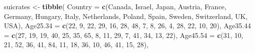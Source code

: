 \documentclass[
]{article}
\newenvironment{Shaded}{\begin{snugshade}}{\end{snugshade}}
\newcommand{\AttributeTok}[1]{\textcolor[rgb]{0.13,0.29,0.53}{#1}}
\newcommand{\DecValTok}[1]{\textcolor[rgb]{0.00,0.00,0.81}{#1}}
\newcommand{\FunctionTok}[1]{\textcolor[rgb]{0.13,0.29,0.53}{\textbf{#1}}}
\newcommand{\NormalTok}[1]{#1}
\newcommand{\OtherTok}[1]{\textcolor[rgb]{0.56,0.35,0.01}{#1}}
\newcommand{\StringTok}[1]{\textcolor[rgb]{0.31,0.60,0.02}{#1}}
\begin{document}
\begin{Shaded}
\begin{Highlighting}[]
\NormalTok{suicrates }\OtherTok{\textless{}{-}} \FunctionTok{tibble}\NormalTok{(}
  \AttributeTok{Country =} \FunctionTok{c}\NormalTok{(}\StringTok{\textquotesingle{}Canada\textquotesingle{}}\NormalTok{, }\StringTok{\textquotesingle{}Israel\textquotesingle{}}\NormalTok{, }\StringTok{\textquotesingle{}Japan\textquotesingle{}}\NormalTok{, }\StringTok{\textquotesingle{}Austria\textquotesingle{}}\NormalTok{, }\StringTok{\textquotesingle{}France\textquotesingle{}}\NormalTok{, }\StringTok{\textquotesingle{}Germany\textquotesingle{}}\NormalTok{, }
              \StringTok{\textquotesingle{}Hungary\textquotesingle{}}\NormalTok{, }\StringTok{\textquotesingle{}Italy\textquotesingle{}}\NormalTok{, }\StringTok{\textquotesingle{}Netherlands\textquotesingle{}}\NormalTok{, }\StringTok{\textquotesingle{}Poland\textquotesingle{}}\NormalTok{, }\StringTok{\textquotesingle{}Spain\textquotesingle{}}\NormalTok{, }\StringTok{\textquotesingle{}Sweden\textquotesingle{}}\NormalTok{, }
              \StringTok{\textquotesingle{}Switzerland\textquotesingle{}}\NormalTok{, }\StringTok{\textquotesingle{}UK\textquotesingle{}}\NormalTok{, }\StringTok{\textquotesingle{}USA\textquotesingle{}}\NormalTok{),}
  \AttributeTok{Age25.34 =} \FunctionTok{c}\NormalTok{(}\DecValTok{22}\NormalTok{, }\DecValTok{9}\NormalTok{, }\DecValTok{22}\NormalTok{, }\DecValTok{29}\NormalTok{, }\DecValTok{16}\NormalTok{, }\DecValTok{28}\NormalTok{, }\DecValTok{48}\NormalTok{, }\DecValTok{7}\NormalTok{, }\DecValTok{8}\NormalTok{, }\DecValTok{26}\NormalTok{, }\DecValTok{4}\NormalTok{, }\DecValTok{28}\NormalTok{, }\DecValTok{22}\NormalTok{, }\DecValTok{10}\NormalTok{, }\DecValTok{20}\NormalTok{),}
  \AttributeTok{Age35.44 =} \FunctionTok{c}\NormalTok{(}\DecValTok{27}\NormalTok{, }\DecValTok{19}\NormalTok{, }\DecValTok{19}\NormalTok{, }\DecValTok{40}\NormalTok{, }\DecValTok{25}\NormalTok{, }\DecValTok{35}\NormalTok{, }\DecValTok{65}\NormalTok{, }\DecValTok{8}\NormalTok{, }\DecValTok{11}\NormalTok{, }\DecValTok{29}\NormalTok{, }\DecValTok{7}\NormalTok{, }\DecValTok{41}\NormalTok{, }\DecValTok{34}\NormalTok{, }\DecValTok{13}\NormalTok{, }\DecValTok{22}\NormalTok{),}
  \AttributeTok{Age45.54 =} \FunctionTok{c}\NormalTok{(}\DecValTok{31}\NormalTok{, }\DecValTok{10}\NormalTok{, }\DecValTok{21}\NormalTok{, }\DecValTok{52}\NormalTok{, }\DecValTok{36}\NormalTok{, }\DecValTok{41}\NormalTok{, }\DecValTok{84}\NormalTok{, }\DecValTok{11}\NormalTok{, }\DecValTok{18}\NormalTok{, }\DecValTok{36}\NormalTok{, }\DecValTok{10}\NormalTok{, }\DecValTok{46}\NormalTok{, }\DecValTok{41}\NormalTok{, }\DecValTok{15}\NormalTok{, }\DecValTok{28}\NormalTok{),}

\end{Highlighting}
\end{Shaded}
\end{document}
